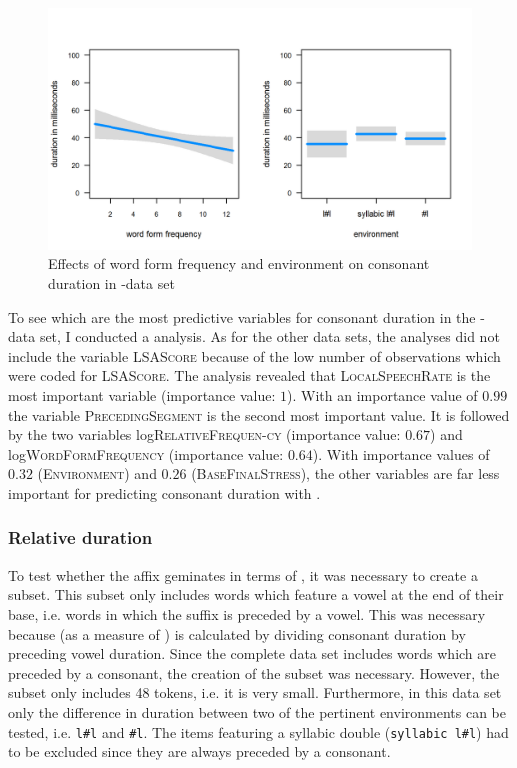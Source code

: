 \begin{figure}
	

	\includegraphics[scale=.8] {images/Corpus/lyModelTransitionTypeAndFreq.png}
	\caption{Effects of word form frequency  and environment on consonant duration in -data set}
	\label{fig:corpus main effects  ly}
\end{figure}




To see which are the most predictive variables for consonant duration in the -data set, I conducted a  analysis. As for the other data sets, the analyses did not include the variable \textsc{LSAScore} because of the low number of observations which were coded for \textsc{LSAScore}. The analysis revealed that \textsc{LocalSpeechRate} is the most important variable (importance value: $1$). With an importance value of $0.99$ the variable \textsc{PrecedingSegment} is the second most important value. It is followed by the two  variables log\textsc{RelativeFrequen-cy} (importance value: $0.67$) and log\textsc{WordFormFrequency} (importance value: $0.64$). With importance values of $0.32$ (\textsc{Environment}) and $0.26$ (\textsc{BaseFinalStress}), the other variables are far less important for predicting consonant duration with .


\subsubsection{Relative duration}

To test whether the affix  geminates in terms of , it was necessary to create a subset. This subset only includes words which feature a vowel at the end of their base, i.e. words in which the suffix is preceded by a vowel. This was necessary because  (as a measure of ) is calculated by dividing consonant duration by preceding vowel duration. Since the complete data set includes words which are preceded by a consonant, the creation of the subset was necessary.
However, the subset only includes 48 tokens, i.e. it is very small. Furthermore, in this data set only the difference in duration between two of the pertinent environments can be tested, i.e. \texttt{l\#l} and \texttt{\#l}. The items featuring a syllabic double (\texttt{syllabic l\#l}) had to be excluded since they are always preceded by a consonant. 

